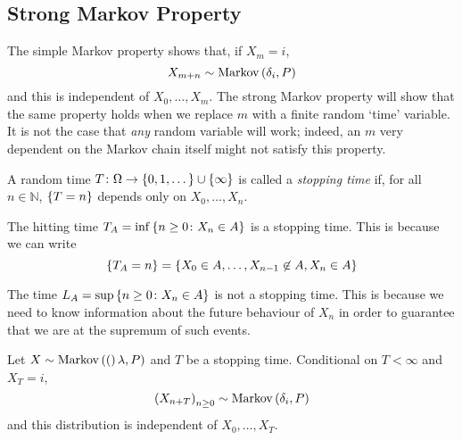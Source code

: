 \subsection{Strong Markov Property}
The simple Markov property shows that, if \( X_m = i \),
\[
	X_{m + n} \sim \operatorname{Markov}\left({\delta_i, P}\right)
\]
and this is independent of \( X_0, \dots, X_m \).
The strong Markov property will show that the same property holds when we replace \( m \) with a finite random `time' variable.
It is not the case that \textit{any} random variable will work; indeed, an \( m \) very dependent on the Markov chain itself might not satisfy this property.
\begin{definition}
	A random time \( T \colon \Omega \to \qty{0, 1, \dots} \cup \qty{\infty} \) is called a \textit{stopping time} if, for all \( n \in \mathbb N \), \( \qty{ T = n } \) depends only on \( X_0, \dots, X_n \).
\end{definition}
\begin{example}
	The hitting time \( T_A = \inf \qty{ n \geq 0 \colon X_n \in A} \) is a stopping time.
	This is because we can write
	\[
		\qty{T_A = n} = \qty{X_0 \in A, \dots, X_{n-1} \not\in A, X_n \in A}
	\]
\end{example}
\begin{example}
	The time \( L_A = \sup \qty{n \geq 0 \colon X_n \in A} \) is not a stopping time.
	This is because we need to know information about the future behaviour of \( X_n \) in order to guarantee that we are at the supremum of such events.
\end{example}
\begin{theorem}
	Let \( X \sim \operatorname{Markov}\left({(}\right)\lambda, P) \) and \( T \) be a stopping time.
	Conditional on \( T < \infty \) and \( X_T = i \),
	\[
		\qty(X_{n + T})_{n \geq 0} \sim \operatorname{Markov}\left({\delta_i, P}\right)
	\]
	and this distribution is independent of \( X_0, \dots, X_T \).
\end{theorem}
